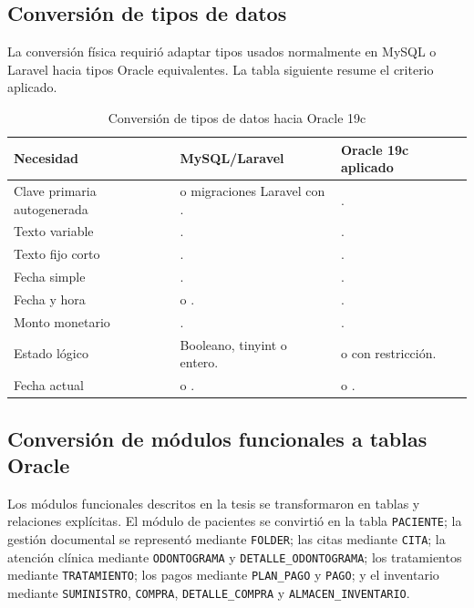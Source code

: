 \subsection{Conversión de tipos de datos}

La conversión física requirió adaptar tipos usados normalmente en MySQL o Laravel hacia tipos Oracle equivalentes. La tabla siguiente resume el criterio aplicado.

\begin{table}[H]
\caption{Conversión de tipos de datos hacia Oracle 19c}
\centering
\small
\begin{tabularx}{\textwidth}{L{0.28\textwidth}L{0.28\textwidth}Y}
\toprule
\textbf{Necesidad} & \textbf{MySQL/Laravel} & \textbf{Oracle 19c aplicado} \\
\midrule
Clave primaria autogenerada &  o migraciones Laravel con . & . \\
Texto variable & . & . \\
Texto fijo corto & . & . \\
Fecha simple & . & . \\
Fecha y hora &  o . & . \\
Monto monetario & . & . \\
Estado lógico & Booleano, tinyint o entero. &  o  con restricción. \\
Fecha actual &  o . &  o . \\
\bottomrule
\end{tabularx}
\end{table}

\subsection{Conversión de módulos funcionales a tablas Oracle}

Los módulos funcionales descritos en la tesis se transformaron en tablas y relaciones explícitas. El módulo de pacientes se convirtió en la tabla \texttt{PACIENTE}; la gestión documental se representó mediante \texttt{FOLDER}; las citas mediante \texttt{CITA}; la atención clínica mediante \texttt{ODONTOGRAMA} y \texttt{DETALLE\_ODONTOGRAMA}; los tratamientos mediante \texttt{TRATAMIENTO}; los pagos mediante \texttt{PLAN\_PAGO} y \texttt{PAGO}; y el inventario mediante \texttt{SUMINISTRO}, \texttt{COMPRA}, \texttt{DETALLE\_COMPRA} y \texttt{ALMACEN\_INVENTARIO}.

